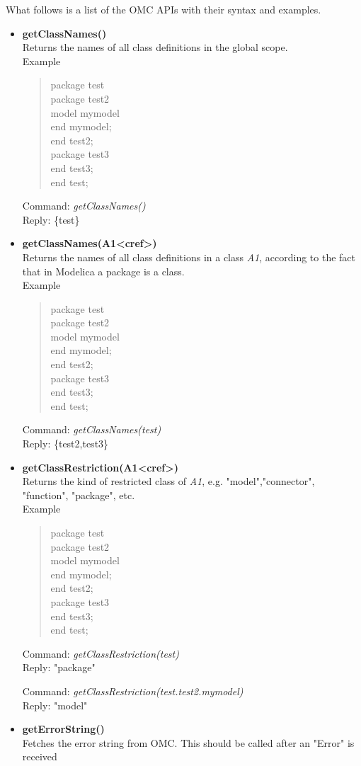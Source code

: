 \documentclass[11pt,a4paper,oneside,english]{book}
\newenvironment{modelicaExamples}{\begin{itemize}}{\end{itemize}}
\newcommand{\api}[2]{\item \textbf{#1} \\ #2}
\newcommand{\tab}{\hspace{2em}}
\newcommand{\command}[1]{Command: \textit{#1}\\}
\newcommand{\reply}[1]{Reply: #1}
\newcommand{\functionex}[2]{\begin{singlespace} \command{#1} \reply{#2} \end{singlespace}}
\newcommand{\examples}{Example}
\newenvironment{mocode}{\begin{verse}\begin{singlespace}\begin{scriptsize}\ttfamily}{\end{scriptsize}\end{singlespace}\end{verse}}
\begin{document}
What follows is a list of the OMC APIs with their syntax and examples.

 	\begin{modelicaExamples}
		\api{getClassNames()}{Returns the names of all class definitions in the global scope.\\ \examples{}
			\begin{mocode}
				package test\\
			    \tab package test2\\
					\tab\tab model mymodel\\
					\tab\tab end mymodel;\\
				\tab end test2;\\
				\tab package test3\\
				\tab end test3;\\
				end test;\\
			\end{mocode}

			\functionex{getClassNames()}
			{\{test\}}

		}
		\api{getClassNames(A1<cref>)}{Returns the names of all class definitions in a class \textit{A1}, according to the fact that in Modelica a package is a class.\\ \examples
			\begin{mocode}
				package test\\
				\tab package test2\\
					\tab\tab model mymodel\\
					\tab\tab end mymodel;\\
				\tab end test2;\\
				\tab package test3\\
				\tab end test3;\\
				end test;\\
			\end{mocode}

			\functionex{getClassNames(test)}
			{\{test2,test3\}}

		}

		\api{getClassRestriction(A1<cref>)}{Returns the kind of restricted class of \textit{A1}, e.g. "model","connector", "function", "package", etc.\\ \examples
			\begin{mocode}
				package test\\
				\tab package test2\\
					\tab\tab model mymodel\\
					\tab\tab end mymodel;\\
				\tab end test2;\\
				\tab package test3\\
				\tab end test3;\\
				end test;\\
			\end{mocode}
			\functionex{getClassRestriction(test)}
			{"package"}
			\functionex{getClassRestriction(test.test2.mymodel)}
			{"model"}
		}
		\api{getErrorString()}{Fetches the error string from OMC. This should be called after an "Error" is received}


\end{modelicaExamples}
\end{document}
